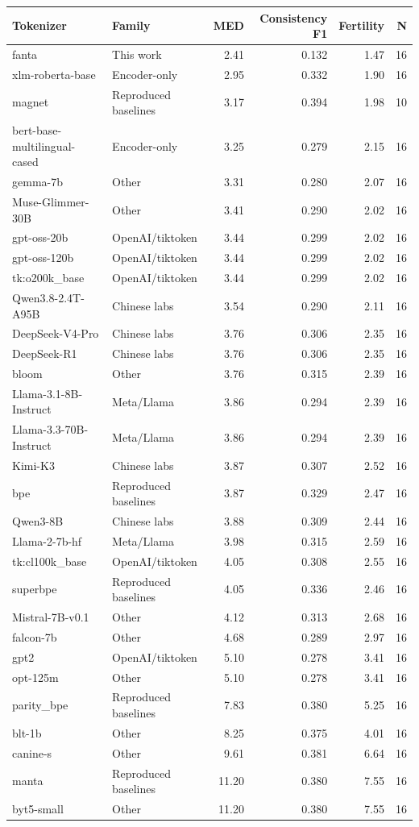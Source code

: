 \begin{tabular}{llrrrr}
\toprule
Tokenizer & Family & MED & Consistency F1 & Fertility & N \\
\midrule
fanta & This work & 2.41 & 0.132 & 1.47 & 16 \\
xlm-roberta-base & Encoder-only & 2.95 & 0.332 & 1.90 & 16 \\
magnet & Reproduced baselines & 3.17 & 0.394 & 1.98 & 10 \\
bert-base-multilingual-cased & Encoder-only & 3.25 & 0.279 & 2.15 & 16 \\
gemma-7b & Other & 3.31 & 0.280 & 2.07 & 16 \\
Muse-Glimmer-30B & Other & 3.41 & 0.290 & 2.02 & 16 \\
gpt-oss-20b & OpenAI/tiktoken & 3.44 & 0.299 & 2.02 & 16 \\
gpt-oss-120b & OpenAI/tiktoken & 3.44 & 0.299 & 2.02 & 16 \\
tk:o200k\_base & OpenAI/tiktoken & 3.44 & 0.299 & 2.02 & 16 \\
Qwen3.8-2.4T-A95B & Chinese labs & 3.54 & 0.290 & 2.11 & 16 \\
DeepSeek-V4-Pro & Chinese labs & 3.76 & 0.306 & 2.35 & 16 \\
DeepSeek-R1 & Chinese labs & 3.76 & 0.306 & 2.35 & 16 \\
bloom & Other & 3.76 & 0.315 & 2.39 & 16 \\
Llama-3.1-8B-Instruct & Meta/Llama & 3.86 & 0.294 & 2.39 & 16 \\
Llama-3.3-70B-Instruct & Meta/Llama & 3.86 & 0.294 & 2.39 & 16 \\
Kimi-K3 & Chinese labs & 3.87 & 0.307 & 2.52 & 16 \\
bpe & Reproduced baselines & 3.87 & 0.329 & 2.47 & 16 \\
Qwen3-8B & Chinese labs & 3.88 & 0.309 & 2.44 & 16 \\
Llama-2-7b-hf & Meta/Llama & 3.98 & 0.315 & 2.59 & 16 \\
tk:cl100k\_base & OpenAI/tiktoken & 4.05 & 0.308 & 2.55 & 16 \\
superbpe & Reproduced baselines & 4.05 & 0.336 & 2.46 & 16 \\
Mistral-7B-v0.1 & Other & 4.12 & 0.313 & 2.68 & 16 \\
falcon-7b & Other & 4.68 & 0.289 & 2.97 & 16 \\
gpt2 & OpenAI/tiktoken & 5.10 & 0.278 & 3.41 & 16 \\
opt-125m & Other & 5.10 & 0.278 & 3.41 & 16 \\
parity\_bpe & Reproduced baselines & 7.83 & 0.380 & 5.25 & 16 \\
blt-1b & Other & 8.25 & 0.375 & 4.01 & 16 \\
canine-s & Other & 9.61 & 0.381 & 6.64 & 16 \\
manta & Reproduced baselines & 11.20 & 0.380 & 7.55 & 16 \\
byt5-small & Other & 11.20 & 0.380 & 7.55 & 16 \\
\bottomrule
\end{tabular}